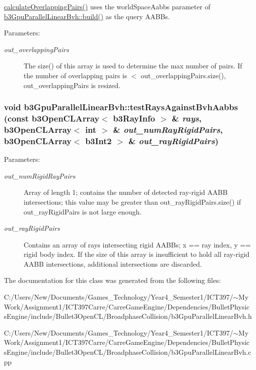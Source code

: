 \hyperlink{classb3_gpu_parallel_linear_bvh_c0208fca9279bdfd66eabd321d98420b}{calculateOverlappingPairs()} uses the worldSpaceAabbs parameter of \hyperlink{classb3_gpu_parallel_linear_bvh_c6e619d22cc2bd9c979900cf83d59143}{b3GpuParallelLinearBvh::build()} as the query AABBs. \begin{Desc}
\item[Parameters:]
\begin{description}
\item[{\em out\_\-overlappingPairs}]The size() of this array is used to determine the max number of pairs. If the number of overlapping pairs is $<$ out\_\-overlappingPairs.size(), out\_\-overlappingPairs is resized. \end{description}
\end{Desc}
\hypertarget{classb3_gpu_parallel_linear_bvh_a2e73543c39fe8a8ba65394fbc33e8bb}{
\subsubsection[testRaysAgainstBvhAabbs]{\setlength{\rightskip}{0pt plus 5cm}void b3GpuParallelLinearBvh::testRaysAgainstBvhAabbs (const b3OpenCLArray$<$ b3RayInfo $>$ \& {\em rays}, \/  b3OpenCLArray$<$ int $>$ \& {\em out\_\-numRayRigidPairs}, \/  b3OpenCLArray$<$ b3Int2 $>$ \& {\em out\_\-rayRigidPairs})}}
\label{classb3_gpu_parallel_linear_bvh_a2e73543c39fe8a8ba65394fbc33e8bb}


\begin{Desc}
\item[Parameters:]
\begin{description}
\item[{\em out\_\-numRigidRayPairs}]Array of length 1; contains the number of detected ray-rigid AABB intersections; this value may be greater than out\_\-rayRigidPairs.size() if out\_\-rayRigidPairs is not large enough. \item[{\em out\_\-rayRigidPairs}]Contains an array of rays intersecting rigid AABBs; x == ray index, y == rigid body index. If the size of this array is insufficient to hold all ray-rigid AABB intersections, additional intersections are discarded. \end{description}
\end{Desc}


The documentation for this class was generated from the following files:\begin{CompactItemize}
\item 
C:/Users/New/Documents/Games\_\-Technology/Year4\_\-Semester1/ICT397/$\sim$My Work/Assignment1/ICT397Carre/CarreGameEngine/Dependencies/BulletPhysicsEngine/include/Bullet3OpenCL/BroadphaseCollision/b3GpuParallelLinearBvh.h\item 
C:/Users/New/Documents/Games\_\-Technology/Year4\_\-Semester1/ICT397/$\sim$My Work/Assignment1/ICT397Carre/CarreGameEngine/Dependencies/BulletPhysicsEngine/include/Bullet3OpenCL/BroadphaseCollision/b3GpuParallelLinearBvh.cpp\end{CompactItemize}
